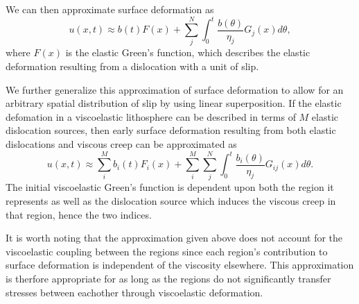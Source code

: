 \documentclass[extra]{gji}
\begin{document}
We can then approximate surface deformation as
\begin{equation}
  u(x,t) \approx b(t)F(x) + \sum_j^N\int_0^t \frac{b(\theta)}{\eta_j}G_j(x) d\theta,
\end{equation}
where $F(x)$ is the elastic Green's function, which describes the
elastic deformation resulting from a dislocation with a unit of slip.

We further generalize this approximation of surface deformation to
allow for an arbitrary spatial distribution of slip by using linear
superposition.  If the elastic defomation in a viscoelastic
lithosphere can be described in terms of $M$ elastic dislocation
sources, then early surface deformation resulting from both elastic
dislocations and viscous creep can be approximated as
\begin{equation}\label{Postseismic_Approximation}
u(x,t) \approx \sum_i^Mb_i(t)F_i(x) + 
               \sum_i^M\sum_j^N\int_0^t\frac{b_i(\theta)}{\eta_j}G_{ij}(x) d\theta.
\end{equation}
The initial viscoelastic Green's function is dependent upon both the
region it represents as well as the dislocation source which induces
the viscous creep in that region, hence the two indices.  

It is worth noting that the approximation given above does not account
for the viscoelastic coupling between the regions since each region's
contribution to surface deformation is independent of the viscosity
elsewhere.  This approximation is therfore appropriate for as long as
the regions do not significantly transfer stresses between eachother
through viscoelastic deformation.
\end{document}
